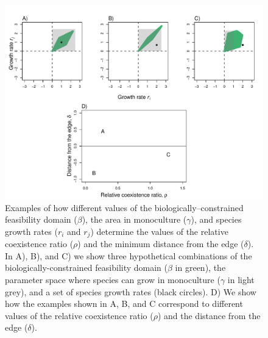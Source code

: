 \begin{figure}[H]
  \centerline{\includegraphics[width=1.1\textwidth]{figures/chapter3_fig2.pdf}}
  \caption[Examples of how different values of the biologically--constrained feasibility domain ($\beta$), the area in monoculture ($\gamma$), and species growth rates ($r_i$ and $r_j$) determine the values of the relative coexistence ratio ($\rho$) and the minimum distance from the edge ($\delta$).]{Examples of how different values of the biologically--constrained feasibility domain ($\beta$), the area in monoculture ($\gamma$), and species growth rates ($r_i$ and $r_j$) determine the values of the relative coexistence ratio ($\rho$) and the minimum distance from the edge ($\delta$). In A), B), and C) we show three hypothetical combinations of the biologically-constrained feasibility domain ($\beta$ in green), the parameter space where species can grow in monoculture ($\gamma$ in light grey), and a set of species growth rates (black circles). D) We show how the examples shown in A, B, and C correspond to different values of the relative coexistence ratio ($\rho$) and the distance from the edge ($\delta$).  }
  \label{fig:rho_delta}
\end{figure}


